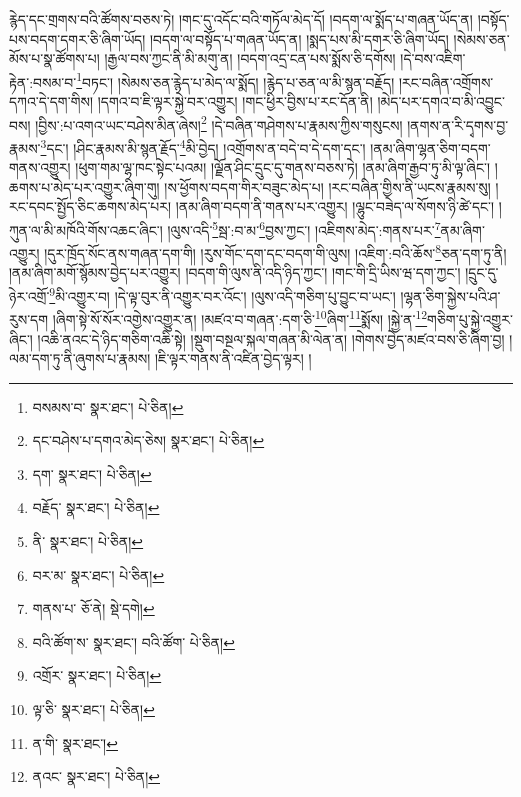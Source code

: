 རྙེད་དང་གྲགས་བའི་ཚོགས་བཅས་ཏེ། །གང་དུ་འདོང་བའི་གཏོལ་མེད་དོ། །བདག་ལ་སྨོད་པ་གཞན་ཡོད་ན། །བསྟོད་པས་བདག་དགར་ཅི་ཞིག་ཡོད། །བདག་ལ་བསྟོད་པ་གཞན་ཡོད་ན། །སྨད་པས་མི་དགར་ཅི་ཞིག་ཡོད། །སེམས་ཅན་མོས་པ་སྣ་ཚོགས་པ། །རྒྱལ་བས་ཀྱང་ནི་མི་མགུ་ན། །བདག་འདྲ་ངན་པས་སྨོས་ཅི་དགོས། །དེ་བས་འཇིག་རྟེན་:བསམ་བ་\footnote{བསམས་བ་  སྣར་ཐང་།  པེ་ཅིན། }བཏང་། །སེམས་ཅན་རྙེད་པ་མེད་ལ་སྨོད། །རྙེད་པ་ཅན་ལ་མི་སྙན་བརྗོད། །རང་བཞིན་འགྲོགས་དཀའ་དེ་དག་གིས། །དགའ་བ་ཇི་ལྟར་སྐྱེ་བར་འགྱུར། །གང་ཕྱིར་བྱིས་པ་རང་དོན་ནི། །མེད་པར་དགའ་བ་མི་འབྱུང་བས། །བྱིས་:པ་འགའ་ཡང་བཤེས་མིན་ཞེས།\footnote{དང་བཤེས་པ་དགའ་མེད་ཅེས།  སྣར་ཐང་།  པེ་ཅིན། } །དེ་བཞིན་གཤེགས་པ་རྣམས་ཀྱིས་གསུངས། །ནགས་ན་རི་དྭགས་བྱ་རྣམས་\footnote{དག་  སྣར་ཐང་།  པེ་ཅིན། }དང་། །ཤིང་རྣམས་མི་སྙན་རྗོད་\footnote{བརྗོད་  སྣར་ཐང་།  པེ་ཅིན། }མི་བྱེད། །འགྲོགས་ན་བདེ་བ་དེ་དག་དང་། །ནམ་ཞིག་ལྷན་ཅིག་བདག་གནས་འགྱུར། །ཕུག་གམ་ལྷ་ཁང་སྟེང་པའམ། །ལྗོན་ཤིང་དྲུང་དུ་གནས་བཅས་ཏེ། །ནམ་ཞིག་རྒྱབ་ཏུ་མི་ལྟ་ཞིང་། །ཆགས་པ་མེད་པར་འགྱུར་ཞིག་གུ། །ས་ཕྱོགས་བདག་གིར་བཟུང་མེད་པ། །རང་བཞིན་གྱིས་ནི་ཡངས་རྣམས་སུ། །རང་དབང་སྤྱོད་ཅིང་ཆགས་མེད་པར། །ནམ་ཞིག་བདག་ནི་གནས་པར་འགྱུར། །ལྷུང་བཟེད་ལ་སོགས་ཉི་ཚེ་དང་། །ཀུན་ལ་མི་མཁོའི་གོས་འཆང་ཞིང་། །ལུས་འདི་\footnote{ནི་  སྣར་ཐང་།  པེ་ཅིན། }སྦ་:བ་མ་\footnote{བར་མ་  སྣར་ཐང་།  པེ་ཅིན། }བྱས་ཀྱང་། །འཇིགས་མེད་:གནས་པར་\footnote{གནས་པ་  ཅོ་ནེ།  སྡེ་དགེ། }ནམ་ཞིག་འགྱུར། །དུར་ཁྲོད་སོང་ནས་གཞན་དག་གི། །རུས་གོང་དག་དང་བདག་གི་ལུས། །འཇིག་:བའི་ཆོས་\footnote{བའི་ཚོག་ས་  སྣར་ཐང་། བའི་ཚོག་  པེ་ཅིན། }ཅན་དག་ཏུ་ནི། །ནམ་ཞིག་མགོ་སྙོམས་བྱེད་པར་འགྱུར། །བདག་གི་ལུས་ནི་འདི་ཉིད་ཀྱང་། །གང་གི་དྲི་ཡིས་ཝ་དག་ཀྱང་། །དྲུང་དུ་ཉེར་འགྲོ་\footnote{འགྲོར་  སྣར་ཐང་།  པེ་ཅིན། }མི་འགྱུར་བ། །དེ་ལྟ་བུར་ནི་འགྱུར་བར་འོང་། །ལུས་འདི་གཅིག་པུ་བྱུང་བ་ཡང་། །ལྷན་ཅིག་སྐྱེས་པའི་ཤ་རུས་དག །ཞིག་སྟེ་སོ་སོར་འགྱེས་འགྱུར་ན། །མཛའ་བ་གཞན་:དག་ཅི་\footnote{ལྟ་ཅི་  སྣར་ཐང་།  པེ་ཅིན། }ཞིག་\footnote{ན་གི་  སྣར་ཐང་། }སྨོས། །སྐྱེ་ན་\footnote{ནའང་  སྣར་ཐང་།  པེ་ཅིན། }གཅིག་པུ་སྐྱེ་འགྱུར་ཞིང་། །འཆི་ནའང་དེ་ཉིད་གཅིག་འཆི་སྟེ། །སྡུག་བསྔལ་སྐལ་གཞན་མི་ལེན་ན། །གེགས་བྱེད་མཛའ་བས་ཅི་ཞིག་བྱ། །ལམ་དག་ཏུ་ནི་ཞུགས་པ་རྣམས། །ཇི་ལྟར་གནས་ནི་འཛིན་བྱེད་ལྟར། །
